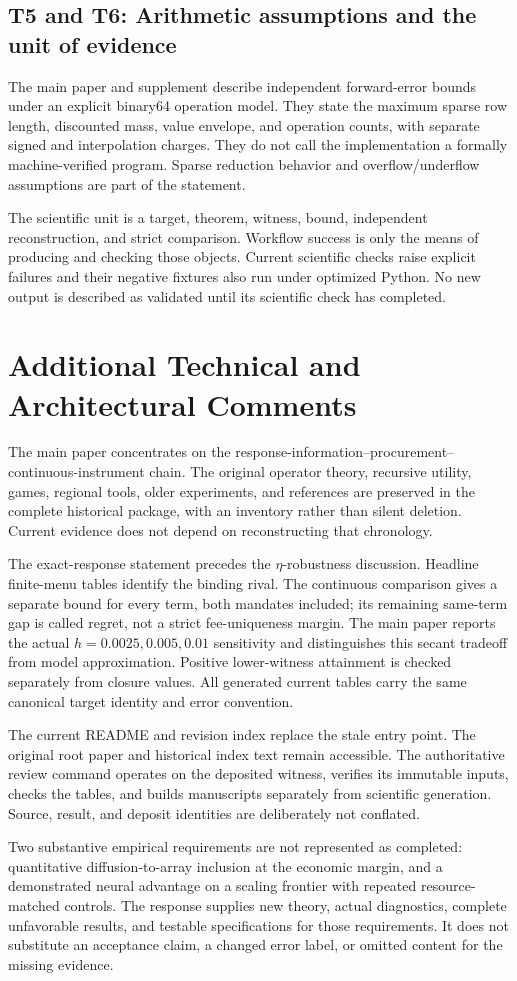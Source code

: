 \subsection{T5 and T6: Arithmetic assumptions and the unit of evidence}
The main paper and supplement describe independent forward-error bounds under an explicit binary64 operation model. They state the maximum sparse row length, discounted mass, value envelope, and operation counts, with separate signed and interpolation charges. They do not call the implementation a formally machine-verified program. Sparse reduction behavior and overflow/underflow assumptions are part of the statement.

The scientific unit is a target, theorem, witness, bound, independent reconstruction, and strict comparison. Workflow success is only the means of producing and checking those objects. Current scientific checks raise explicit failures and their negative fixtures also run under optimized Python. No new output is described as validated until its scientific check has completed.

\section{Additional Technical and Architectural Comments}
The main paper concentrates on the response-information--procurement--continuous-instrument chain. The original operator theory, recursive utility, games, regional tools, older experiments, and references are preserved in the complete historical package, with an inventory rather than silent deletion. Current evidence does not depend on reconstructing that chronology.

The exact-response statement precedes the $\eta$-robustness discussion. Headline finite-menu tables identify the binding rival. The continuous comparison gives a separate bound for every term, both mandates included; its remaining same-term gap is called regret, not a strict fee-uniqueness margin. The main paper reports the actual $h=0.0025,0.005,0.01$ sensitivity and distinguishes this secant tradeoff from model approximation. Positive lower-witness attainment is checked separately from closure values. All generated current tables carry the same canonical target identity and error convention.

The current README and revision index replace the stale entry point. The original root paper and historical index text remain accessible. The authoritative review command operates on the deposited witness, verifies its immutable inputs, checks the tables, and builds manuscripts separately from scientific generation. Source, result, and deposit identities are deliberately not conflated.

Two substantive empirical requirements are not represented as completed: quantitative diffusion-to-array inclusion at the economic margin, and a demonstrated neural advantage on a scaling frontier with repeated resource-matched controls. The response supplies new theory, actual diagnostics, complete unfavorable results, and testable specifications for those requirements. It does not substitute an acceptance claim, a changed error label, or omitted content for the missing evidence.
